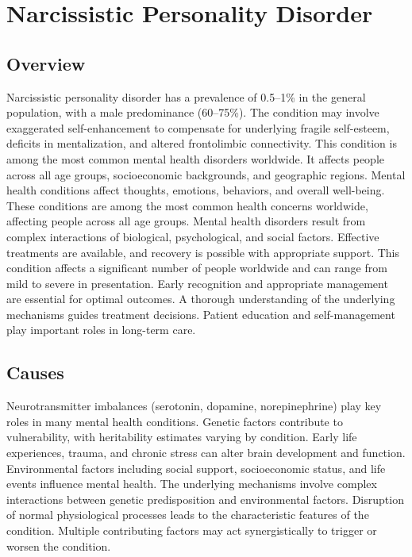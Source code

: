 \chapter{Narcissistic Personality Disorder}
\label{sec:Narcissistic Personality Disorder}

\section{Overview}
Narcissistic personality disorder has a prevalence of 0.5--1\% in the general population, with a male predominance (60--75\%). The condition may involve exaggerated self-enhancement to compensate for underlying fragile self-esteem, deficits in mentalization, and altered frontolimbic connectivity. This condition is among the most common mental health disorders worldwide. It affects people across all age groups, socioeconomic backgrounds, and geographic regions. Mental health conditions affect thoughts, emotions, behaviors, and overall well-being. These conditions are among the most common health concerns worldwide, affecting people across all age groups. Mental health disorders result from complex interactions of biological, psychological, and social factors. Effective treatments are available, and recovery is possible with appropriate support. This condition affects a significant number of people worldwide and can range from mild to severe in presentation. Early recognition and appropriate management are essential for optimal outcomes. A thorough understanding of the underlying mechanisms guides treatment decisions. Patient education and self-management play important roles in long-term care.
\section{Causes}
Neurotransmitter imbalances (serotonin, dopamine, norepinephrine) play key roles in many mental health conditions. Genetic factors contribute to vulnerability, with heritability estimates varying by condition. Early life experiences, trauma, and chronic stress can alter brain development and function. Environmental factors including social support, socioeconomic status, and life events influence mental health. The underlying mechanisms involve complex interactions between genetic predisposition and environmental factors. Disruption of normal physiological processes leads to the characteristic features of the condition. Multiple contributing factors may act synergistically to trigger or worsen the condition.
